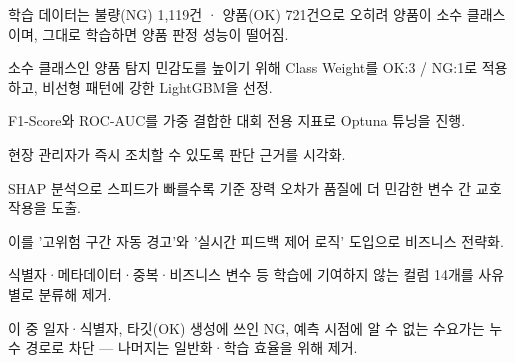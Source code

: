 \begin{substeps}
  \item 학습 데이터는 불량(NG) 1,119건 · 양품(OK) 721건으로 오히려 양품이 소수 클래스이며, 그대로 학습하면 양품 판정 성능이 떨어짐.
  \item 소수 클래스인 양품 탐지 민감도를 높이기 위해 Class Weight를 OK:3 / NG:1로 적용하고, 비선형 패턴에 강한 LightGBM을 선정.
  \item F1-Score와 ROC-AUC를 가중 결합한 대회 전용 지표로 Optuna 튜닝을 진행.
\end{substeps}

\begin{substeps}
  \item 현장 관리자가 즉시 조치할 수 있도록 판단 근거를 시각화.
  \item SHAP 분석으로 스피드가 빠를수록 기준 장력 오차가 품질에 더 민감한 변수 간 교호작용을 도출.
  \item 이를 '고위험 구간 자동 경고'와 '실시간 피드백 제어 로직' 도입으로 비즈니스 전략화.
\end{substeps}

\begin{substeps}
  \item 식별자·메타데이터·중복·비즈니스 변수 등 학습에 기여하지 않는 컬럼 14개를 사유별로 분류해 제거.
  \item 이 중 일자·식별자, 타깃(OK) 생성에 쓰인 NG, 예측 시점에 알 수 없는 수요가는 누수 경로로 차단 --- 나머지는 일반화·학습 효율을 위해 제거.
\end{substeps}

